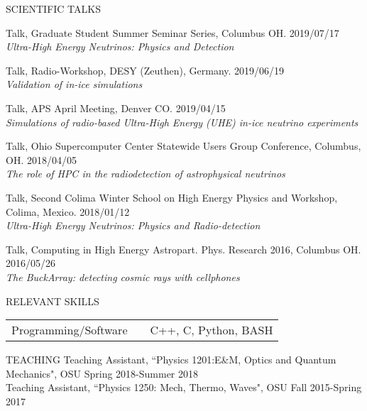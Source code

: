 \documentclass{resume} %
\begin{document}
\begin{rSection}{SCIENTIFIC TALKS}
\begin{etaremune}[]
\item Talk, Graduate Student Summer Seminar Series, Columbus OH. \hfill 2019/07/17 \\
{\em Ultra-High Energy Neutrinos: Physics and Detection} 
\item Talk, Radio-Workshop, DESY (Zeuthen), Germany. \hfill 2019/06/19 \\
{\em Validation of in-ice simulations} 
\item Talk, APS April Meeting, Denver CO. \hfill 2019/04/15 \\
{\em Simulations of radio-based Ultra-High Energy (UHE) in-ice neutrino experiments} 
\item Talk, Ohio Supercomputer Center Statewide Users Group Conference, Columbus, OH. \hfill 2018/04/05 \\
{\em The role of HPC in the radiodetection of astrophysical neutrinos} 
\item Talk, Second Colima Winter School on High Energy Physics and Workshop, Colima, Mexico. \hfill 2018/01/12 \\
{\em Ultra-High Energy Neutrinos: Physics and Radio-detection} 
\item Talk, Computing in High Energy Astropart. Phys. Research 2016, Columbus OH. \hfill 2016/05/26 \\
{\em The BuckArray: detecting cosmic rays with cellphones} 
 \end{etaremune}
\end{rSection}
\vspace{-0.10cm}

\begin{rSection}{RELEVANT SKILLS}
\begin{tabular}{@{}l l l@{}}
 Programming/Software & & C++, C, Python, BASH \\ 
\end{tabular}
\end{rSection}

\begin{rSection}{TEACHING}
Teaching Assistant, ``Physics 1201:E\&M, Optics and Quantum Mechanics", OSU \hfill {Spring 2018-Summer 2018}\\
Teaching Assistant, ``Physics 1250: Mech, Thermo, Waves", OSU \hfill {Fall 2015-Spring 2017}\\
\end{rSection}
\vspace{-0.35cm}
\end{document}
